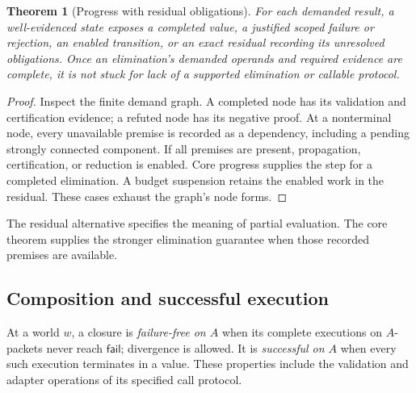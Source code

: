 \documentclass[10pt,a4paper]{article}
\newcommand{\Fail}{\mathsf{fail}}
\newtheorem{theorem}[definition]{Theorem}
\theoremstyle{remark}
\begin{document}
\begin{theorem}[Progress with residual obligations]\label{thm:state-progress}
For each demanded result, a well-evidenced state exposes a completed value, a
justified scoped failure or rejection, an enabled transition, or an exact
residual recording its unresolved obligations. Once an elimination's demanded
operands and required evidence are complete, it is not stuck for lack of a
supported elimination or callable protocol.
\end{theorem}
\begin{proof}
Inspect the finite demand graph. A completed node has its validation and
certification evidence; a refuted node has its negative proof. At a nonterminal
node, every unavailable premise is recorded as a dependency, including a pending
strongly connected component. If all premises are present, propagation,
certification, or reduction is enabled. Core progress supplies the step for a
completed elimination. A budget suspension retains the enabled work in the
residual. These cases exhaust the graph's node forms.
\end{proof}
The residual alternative specifies the meaning of partial evaluation. The core
theorem supplies the stronger elimination guarantee when those recorded
premises are available.

\subsection{Composition and successful execution}
At a world $w$, a closure is \emph{failure-free on $A$} when its complete
executions on $A$-packets never reach $\Fail$; divergence is allowed. It is
\emph{successful on $A$} when every such execution terminates in a value.
These properties include the validation and adapter operations of its specified
call protocol.
\end{document}
